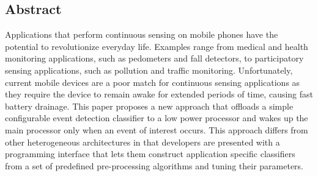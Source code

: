 \subsection*{Abstract}
 
Applications that perform continuous sensing on mobile phones have the
potential to revolutionize everyday life.  Examples range from medical
and health monitoring applications, such as pedometers and fall
detectors, to participatory sensing applications, such as pollution
and traffic monitoring.  Unfortunately, current mobile devices are a
poor match for continuous sensing applications as they require the
device to remain awake for extended periods of time, causing fast
battery drainage.  This paper proposes a new approach that offloads a
simple configurable event detection classifier to a low power
processor and wakes up the main processor only when an event of
interest occurs.  This approach differs from other heterogeneous
architectures in that developers are presented with a programming
interface that lets them construct application specific classifiers
from a set of predefined pre-processing algorithms and tuning their
parameters.
 
